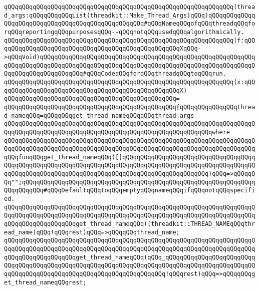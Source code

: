 \verb|qQQqqQQqqQQqqQQqqQQqqQQqqQQqqQQqqQQqqQQqqQQqqQQqqQQqqQQqqQQqqQQq(thread_args:qQQqqQQqqQQqList(threadkit::Make_Thread_Args)qQQq)qQQqqQQqqQQqqQQqqQQqqQQqqQQqqQQqqQQqqQQqqQQqqQQqqQQq#qQQqNameqQQqofqQQqthreadqQQqforqQQqreportingqQQqpurposesqQQq--qQQqnotqQQqusedqQQqalgorithmically.|\newline
\verb|qQQqqQQqqQQqqQQqqQQqqQQqqQQqqQQqqQQqqQQqqQQqqQQqqQQqqQQqqQQqqQQq(f:qQQqqQQqqQQqqQQqqQQqqQQqqQQqqQQqqQQqqQQqqQQqqQQqqQQqXqQQq->qQQqVoid)qQQqqQQqqQQqqQQqqQQqqQQqqQQqqQQqqQQqqQQqqQQqqQQqqQQqqQQqqQQqqQQqqQQqqQQqqQQqqQQqqQQqqQQqqQQqqQQqqQQqqQQqqQQqqQQqqQQqqQQqqQQqqQQqqQQqqQQqqQQqqQQqqQQqqQQq#qQQqCodeqQQqforqQQqthreadqQQqtoqQQqrun.|\newline
\verb|qQQqqQQqqQQqqQQqqQQqqQQqqQQqqQQqqQQqqQQqqQQqqQQqqQQqqQQqqQQqqQQq(x:qQQqqQQqqQQqqQQqqQQqqQQqqQQqqQQqqQQqqQQqqQQqqQQqqQQqX)|\newline
\verb|qQQqqQQqqQQqqQQqqQQqqQQqqQQqqQQqqQQqqQQqqQQqqQQq=|\newline
\verb|qQQqqQQqqQQqqQQqqQQqqQQqqQQqqQQqqQQqqQQqqQQqqQQq{qQQqqQQqqQQqqQQqthread_nameqQQq=qQQqqQQqget_thread_nameqQQqqQQqthread_args|\newline
\verb|qQQqqQQqqQQqqQQqqQQqqQQqqQQqqQQqqQQqqQQqqQQqqQQqqQQqqQQqqQQqqQQqqQQqqQQqqQQqqQQqqQQqqQQqqQQqqQQqqQQqqQQqqQQqqQQqqQQqqQQqqQQqqQQqwhere|\newline
\verb|qQQqqQQqqQQqqQQqqQQqqQQqqQQqqQQqqQQqqQQqqQQqqQQqqQQqqQQqqQQqqQQqqQQqqQQqqQQqqQQqqQQqqQQqqQQqqQQqqQQqqQQqqQQqqQQqqQQqqQQqqQQqqQQqqQQqqQQqqQQqqQQqfunqQQqget_thread_nameqQQq([]qQQqqQQqqQQqqQQqqQQqqQQqqQQqqQQqqQQqqQQqqQQqqQQqqQQqqQQqqQQqqQQqqQQqqQQqqQQqqQQqqQQqqQQqqQQqqQQqqQQqqQQqqQQqqQQqqQQqqQQqqQQqqQQqqQQqqQQqqQQqqQQqqQQqqQQqqQQqqQQqqQQq)qQQq=>qQQqqQQq"";qQQqqQQqqQQqqQQqqQQqqQQqqQQqqQQqqQQqqQQqqQQqqQQqqQQqqQQqqQQqqQQqqQQqqQQqqQQq#qQQqDefaultqQQqtoqQQqemptyqQQqnameqQQqifqQQqnotqQQqspecified.|\newline
\verb|qQQqqQQqqQQqqQQqqQQqqQQqqQQqqQQqqQQqqQQqqQQqqQQqqQQqqQQqqQQqqQQqqQQqqQQqqQQqqQQqqQQqqQQqqQQqqQQqqQQqqQQqqQQqqQQqqQQqqQQqqQQqqQQqqQQqqQQqqQQqqQQqqQQqqQQqqQQqqQQqget_thread_nameqQQq((threadkit::THREAD_NAMEqQQqthread_name)qQQq!qQQqrest)qQQq=>qQQqqQQqthread_name;|\newline
\verb|qQQqqQQqqQQqqQQqqQQqqQQqqQQqqQQqqQQqqQQqqQQqqQQqqQQqqQQqqQQqqQQqqQQqqQQqqQQqqQQqqQQqqQQqqQQqqQQqqQQqqQQqqQQqqQQqqQQqqQQqqQQqqQQqqQQqqQQqqQQqqQQqqQQqqQQqqQQqqQQqget_thread_nameqQQq(qQQq_qQQqqQQqqQQqqQQqqQQqqQQqqQQqqQQqqQQqqQQqqQQqqQQqqQQqqQQqqQQqqQQqqQQqqQQqqQQqqQQqqQQqqQQqqQQqqQQqqQQqqQQqqQQqqQQqqQQqqQQqqQQqqQQqqQQqqQQqqQQq!qQQqrest)qQQq=>qQQqqQQqget_thread_nameqQQqrest;|\newline
